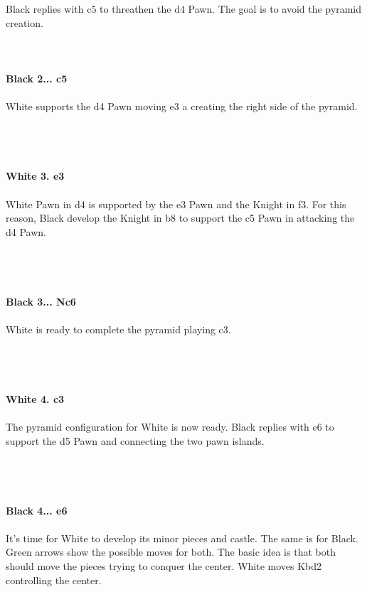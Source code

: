 \documentclass{article}
\begin{document}

\\
\\
Black replies with c5 to threathen the d4 Pawn. The goal is to avoid the pyramid creation.\\
\\

\\
\\
\textbf{Black 2... c5}\\
\\
White supports the d4 Pawn moving e3 a creating the right side of the pyramid.\\\\
\\

\\
\\
\textbf{White 3. e3}\\
\\
White Pawn in d4 is supported by the e3 Pawn and the Knight in f3. For this reason, Black develop the Knight in b8 to support the c5 Pawn in attacking the d4 Pawn.\\\\
\\

\\
\\
\textbf{Black 3... Nc6}\\
\\
White is ready to complete the pyramid playing c3.\\\\
\\

\\
\\
\textbf{White 4. c3}\\
\\
The pyramid configuration for White is now ready. Black replies with e6 to support the d5 Pawn and connecting the two pawn islands.\\\\
\\

\\
\\
\textbf{Black 4... e6}\\
\\
It's time for White to develop its minor pieces and castle. The same is for Black. Green arrows show the possible moves for both. The basic idea is that both should move the pieces trying to conquer the center. White moves Kbd2 controlling the center.\\\\
\end{document}
